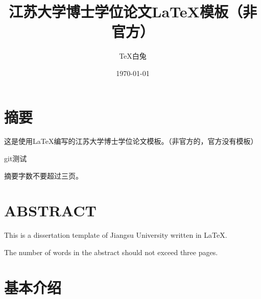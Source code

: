 \documentclass[openright,twoside]{UJS-PhD-thesis}
\title[2]{江苏大学博士学位论文\LaTeX{}模板\qquad （非官方）}
\author{\TeX{}白兔}              %
\date{\today}
\begin{document}
\maketitle             %

\makeauthorization     %

\makecninnertitle      %

\makeeninnertitle      %

\frontmatter


\chapter*{摘\qquad 要}

这是使用\LaTeX{}编写的江苏大学博士学位论文模板。（非官方的，官方没有模板）

git测试


摘要字数不要超过三页。

\zhlipsum[3-8]     %


\chapter*{ABSTRACT}

This is a dissertation template of Jiangsu University written in \LaTeX{}.

The number of words in the abstract should not exceed three pages.

\lipsum[3-8]


\tableofcontents      %

\mainmatter


\chapter{基本介绍}
\end{document}
